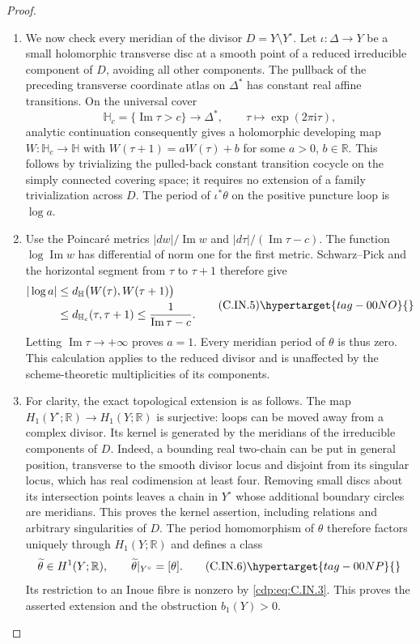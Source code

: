 \begin{proof}
\begin{enumerate}[label={$\langle1\rangle$\arabic*.},leftmargin=*]
\item We now check every meridian of the divisor
$D=Y\setminus Y^\circ$. Let $\iota:\Delta\to Y$ be a small
holomorphic transverse disc at a smooth point of a reduced
irreducible component of $D$, avoiding all other components.
The pullback of the preceding transverse coordinate atlas on
$\Delta^*$ has constant real affine transitions. On the universal
cover
\[
 \mathbb H_c=\{\operatorname{Im}\tau>c\}
 \longrightarrow\Delta^*,\qquad
 \tau\longmapsto\exp(2\pi\mathrm i\tau),
\]
analytic continuation consequently gives a holomorphic developing
map $W:\mathbb H_c\to\mathbb H$ with
$W(\tau+1)=aW(\tau)+b$ for some $a>0$, $b\in\mathbb R$.
This follows by trivializing the pulled-back constant transition
cocycle on the simply connected covering space; it requires no
extension of a family trivialization across $D$.
The period of $\iota^*\theta$ on the positive puncture loop is
$\log a$.

\item Use the Poincar\'e metrics
$|dw|/\operatorname{Im}w$ and
$|d\tau|/(\operatorname{Im}\tau-c)$.
The function $\log\operatorname{Im}w$ has differential of norm
one for the first metric. Schwarz--Pick and the horizontal segment
from $\tau$ to $\tau+1$ therefore give
\[
\begin{aligned}
 |\log a|
 &\le d_{\mathbb H}\bigl(W(\tau),W(\tau+1)\bigr)\\
 &\le d_{\mathbb H_c}(\tau,\tau+1)
 \le\frac{1}{\operatorname{Im}\tau-c}.
\end{aligned}
\tag{C.IN.5}\hypertarget{tag-00NO}{}\label{cdp:eq:C.IN.5}
\]
Letting $\operatorname{Im}\tau\to+\infty$ proves $a=1$.
Every meridian period of $\theta$ is thus zero. This calculation
applies to the reduced divisor and is unaffected by the
scheme-theoretic multiplicities of its components.

\item For clarity, the exact topological extension is as follows.
The map $H_1(Y^\circ;\mathbb R)\to H_1(Y;\mathbb R)$ is
surjective: loops can be moved away from a complex divisor.
Its kernel is generated by the meridians of the irreducible
components of $D$. Indeed, a bounding real two-chain can be put
in general position, transverse to the smooth divisor locus and
disjoint from its singular locus, which has real codimension at
least four. Removing small discs about its intersection points
leaves a chain in $Y^\circ$ whose additional boundary circles
are meridians. This proves the kernel assertion, including
relations and arbitrary singularities of $D$.
The period homomorphism of $\theta$ therefore factors uniquely
through $H_1(Y;\mathbb R)$ and defines a class
\[
 \widetilde\theta\in H^1(Y;\mathbb R),\qquad
 \widetilde\theta|_{Y^\circ}=[\theta].
\tag{C.IN.6}\hypertarget{tag-00NP}{}\label{cdp:eq:C.IN.6}
\]
Its restriction to an Inoue fibre is nonzero by \eqref{cdp:eq:C.IN.3}.
This proves the asserted extension and the obstruction $b_1(Y)>0$.


\end{enumerate}
\end{proof}
